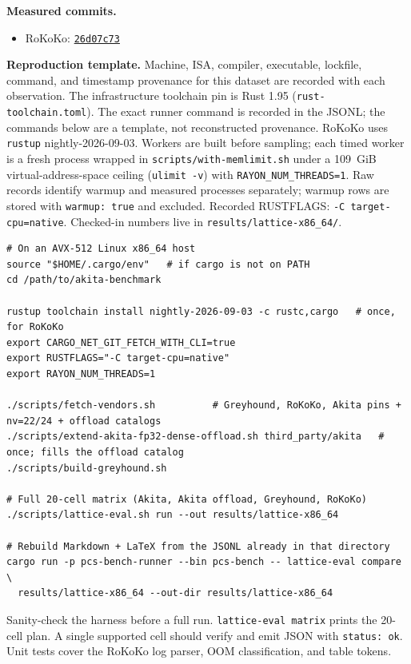 \medskip
\noindent\textbf{Measured commits.}
\begin{itemize}\setlength{\itemsep}{0pt}
\item RoKoKo: \href{https://github.com/lattice-arguments/rokoko/commit/26d07c73c54872b9e8d2b3200117a6a0a21b10ee}{\texttt{26d07c73}}
\end{itemize}


\medskip
\noindent\textbf{Reproduction template.}
Machine, ISA, compiler, executable, lockfile, command, and timestamp provenance
for this dataset are recorded with each observation. The infrastructure
toolchain pin is Rust 1.95 (\texttt{rust-toolchain.toml}).
The exact runner command is recorded in the JSONL; the commands below are a
template, not reconstructed provenance.
RoKoKo uses \texttt{rustup} nightly-2026-09-03. Workers are built before
sampling; each timed worker is a fresh process wrapped in
\texttt{scripts/with-memlimit.sh} under a 109~GiB
virtual-address-space ceiling (\texttt{ulimit -v}) with
\texttt{RAYON\_NUM\_THREADS=1}. Raw records identify warmup and measured
processes separately; warmup rows are stored with \texttt{warmup: true} and excluded.
Recorded RUSTFLAGS: \texttt{{-C target-cpu=native}}.
Checked-in numbers live in \texttt{results/lattice-x86\_64/}.
\begin{verbatim}
# On an AVX-512 Linux x86_64 host
source "$HOME/.cargo/env"   # if cargo is not on PATH
cd /path/to/akita-benchmark

rustup toolchain install nightly-2026-09-03 -c rustc,cargo   # once, for RoKoKo
export CARGO_NET_GIT_FETCH_WITH_CLI=true
export RUSTFLAGS="-C target-cpu=native"
export RAYON_NUM_THREADS=1

./scripts/fetch-vendors.sh          # Greyhound, RoKoKo, Akita pins + nv=22/24 + offload catalogs
./scripts/extend-akita-fp32-dense-offload.sh third_party/akita   # once; fills the offload catalog
./scripts/build-greyhound.sh

# Full 20-cell matrix (Akita, Akita offload, Greyhound, RoKoKo)
./scripts/lattice-eval.sh run --out results/lattice-x86_64

# Rebuild Markdown + LaTeX from the JSONL already in that directory
cargo run -p pcs-bench-runner --bin pcs-bench -- lattice-eval compare \
  results/lattice-x86_64 --out-dir results/lattice-x86_64
\end{verbatim}
\noindent Sanity-check the harness before a full run.
\texttt{lattice-eval matrix} prints the 20-cell plan.
A single supported cell should verify and emit JSON with \texttt{status: ok}.
Unit tests cover the RoKoKo log parser, OOM classification, and table tokens.
